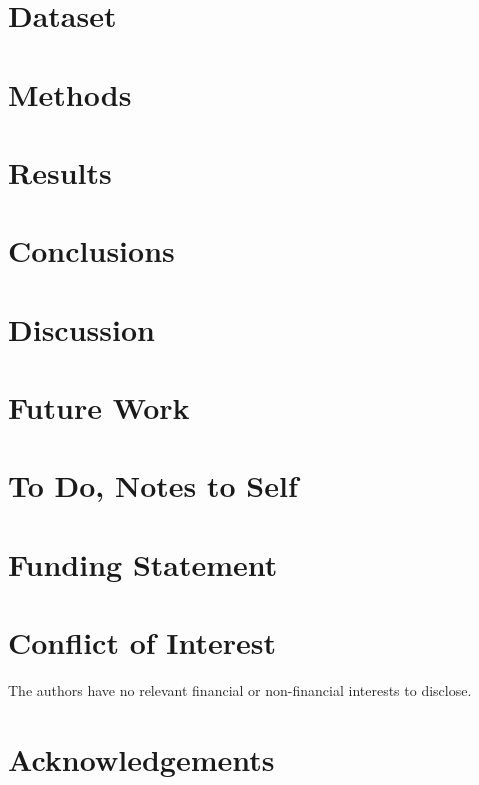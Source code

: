 \documentclass[fleqn]{cas-sc}
\begin{document}
\section{Dataset}\label{Dataset}

\section{Methods}\label{Methods}


\section{Results}\label{Results}


\section{Conclusions}\label{Conclusions}

\section{Discussion}\label{Discussion}

\section{Future Work}\label{FutureWork}

\section{To Do, Notes to Self}


\section*{Funding Statement}

\section*{Conflict of Interest}

The authors have no relevant financial or non-financial interests to disclose.

\section*{Acknowledgements}
\end{document}
